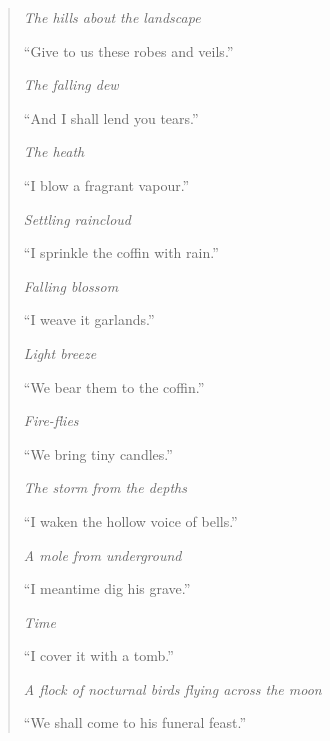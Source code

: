 \begin{verse}
\smallskip

\textit{The hills about the landscape}

\smallskip

``Give to us these robes and veils.”

\smallskip

\textit{The falling dew}

\smallskip

``And I shall lend you tears.”

\smallskip

\textit{The heath}

\smallskip

``I blow a fragrant vapour.”

\smallskip

\textit{Settling raincloud}

\smallskip

``I sprinkle the coffin with rain.”

\smallskip

\textit{Falling blossom}

\smallskip

``I weave it garlands.”

\smallskip

\textit{Light breeze}

``We bear them to the coffin.”

\smallskip

\textit{Fire-flies}

\smallskip

``We bring tiny candles.”

\pagebreak

\textit{The storm from the depths}

\smallskip

``I waken the hollow voice of bells.”

\smallskip

\textit{A mole from underground}

\smallskip

``I meantime dig his grave.”

\smallskip

\textit{Time}

\smallskip

``I cover it with a tomb.”

\smallskip

\textit{A flock of nocturnal birds flying across the moon}

\smallskip

``We shall come to his funeral feast.”


\end{verse}
